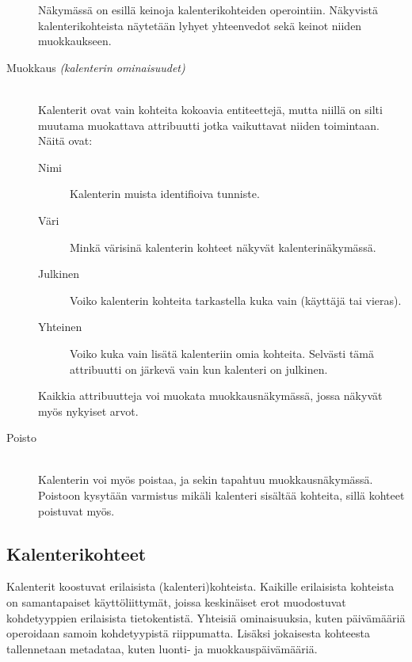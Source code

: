 \documentclass[a4paper,12pt]{report}
\begin{document}
\begin{description}
      Näkymässä on esillä keinoja kalenterikohteiden operointiin.  Näkyvistä
      kalenterikohteista näytetään lyhyet yhteenvedot sekä keinot niiden
      muokkaukseen.
   \item[Muokkaus {\it (kalenterin ominaisuudet)}] \hfill\\
      Kalenterit ovat vain kohteita kokoavia entiteettejä, mutta niillä on silti
      muutama muokattava attribuutti jotka vaikuttavat niiden toimintaan. Näitä
      ovat:
      \begin{description}
         \item[Nimi]  Kalenterin muista identifioiva tunniste.
         \item[Väri]  Minkä värisinä kalenterin kohteet näkyvät
            kalenterinäkymässä.
         \item[Julkinen]  Voiko kalenterin kohteita tarkastella kuka vain
            (käyttäjä tai vieras).
         \item[Yhteinen]  Voiko kuka vain lisätä kalenteriin omia kohteita.
            Selvästi tämä attribuutti on järkevä vain kun kalenteri on
            julkinen.  
      \end{description}

      Kaikkia attribuutteja voi muokata muokkaus\-näkymässä, jossa näkyvät myös
      nykyiset arvot.
   \item[Poisto] \hfill\\
      Kalenterin voi myös poistaa, ja sekin tapahtuu muokkausnäkymässä.
      Poistoon kysytään varmistus mikäli kalenteri sisältää kohteita, sillä
      kohteet poistuvat myös.
\end{description}

\subsection{Kalenterikohteet}
Kalenterit koostuvat erilaisista (kalenteri)kohteista.  Kaikille erilaisista
kohteista on samantapaiset käyttöliittymät, joissa keskinäiset erot muodostuvat
kohdetyyppien erilaisista tietokentistä.  Yhteisiä ominaisuuksia, kuten
päivämääriä operoidaan samoin kohdetyypistä riippumatta.  Lisäksi jokaisesta
kohteesta tallennetaan metadataa, kuten luonti- ja muokkauspäivämääriä.
\end{document}
